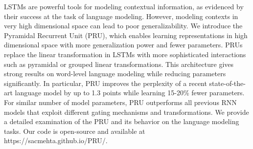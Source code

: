 LSTMs are powerful tools for modeling contextual information, as evidenced by their success at the task of language modeling. However, modeling contexts in very high dimensional space can lead to poor generalizability. We introduce the Pyramidal Recurrent Unit (PRU), which enables learning representations in high dimensional space with more generalization power and fewer parameters. PRUs replace the linear transformation in LSTMs with more sophisticated interactions such as pyramidal or grouped linear transformations. This architecture gives strong results on word-level language modeling while reducing parameters significantly. In particular, PRU improves the perplexity of a recent state-of-the-art language model  by up to 1.3 points while learning 15-20\% fewer parameters. For similar number of model parameters, PRU outperforms all previous RNN models that exploit different gating mechanisms and transformations. We provide a detailed examination of the PRU and its behavior on the language modeling tasks. Our code is open-source and available at https://sacmehta.github.io/PRU/.
